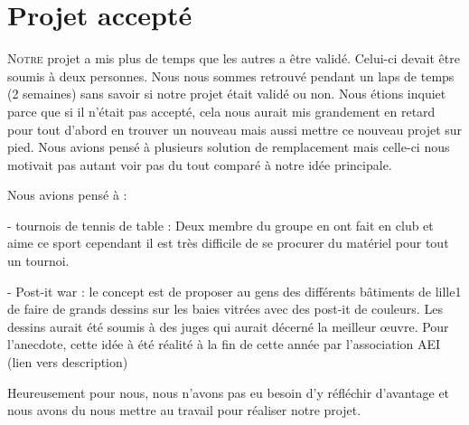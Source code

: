 \section{Projet accepté}%
\label{sec:projet_accepte}

\lettrine{N}{otre} projet a mis plus de temps que les autres a être
validé.  Celui-ci devait être soumis à deux personnes. Nous nous sommes
retrouvé pendant un laps de temps (2 semaines) sans savoir si notre
projet était validé ou non. Nous étions inquiet parce que si il n'était
pas accepté, cela nous aurait mis grandement en retard pour tout d'abord
en trouver un nouveau mais aussi mettre ce nouveau projet sur pied. Nous
avions pensé à plusieurs solution de remplacement mais celle-ci nous
motivait pas autant voir pas du tout comparé à notre idée principale.

Nous avions pensé à :

- tournois de tennis de table : Deux membre du groupe en ont fait en
club et aime ce sport cependant il est très difficile de se procurer du
matériel pour tout un tournoi.

- Post-it war : le concept est de proposer au gens des différents
bâtiments de lille1 de faire de grands dessins sur les baies vitrées
avec des post-it de couleurs. Les dessins aurait été soumis à des juges
qui aurait décerné la meilleur \oe{}uvre.  Pour l'anecdote, cette idée à
été réalité à la fin de cette année par l'association AEI (lien vers
description)

Heureusement pour nous, nous n'avons pas eu besoin d'y réfléchir
d'avantage et nous avons du nous mettre au travail pour réaliser notre
projet.

